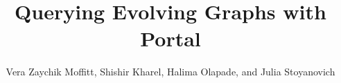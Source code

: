 \documentclass{sig-alternate}
\begin{document}
\title{Querying Evolving Graphs with Portal}

\author{
  \alignauthor Vera Zaychik Moffitt, Shishir Kharel, Halima Olapade, and Julia Stoyanovich\\
  \\
}

\maketitle

\thispagestyle{empty}











\end{document}
